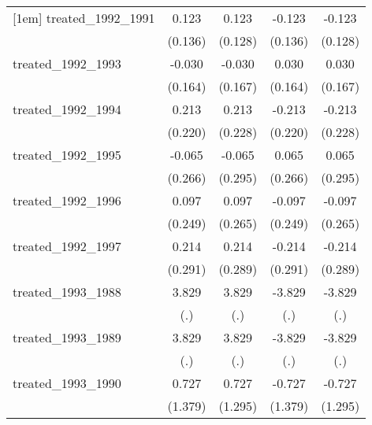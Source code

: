 {\begin{tabular}{l*{4}{c}}
[1em]
treated\_1992\_1991&       0.123         &       0.123         &      -0.123         &      -0.123         \\
            &     (0.136)         &     (0.128)         &     (0.136)         &     (0.128)         \\
[1em]
treated\_1992\_1993&      -0.030         &      -0.030         &       0.030         &       0.030         \\
            &     (0.164)         &     (0.167)         &     (0.164)         &     (0.167)         \\
[1em]
treated\_1992\_1994&       0.213         &       0.213         &      -0.213         &      -0.213         \\
            &     (0.220)         &     (0.228)         &     (0.220)         &     (0.228)         \\
[1em]
treated\_1992\_1995&      -0.065         &      -0.065         &       0.065         &       0.065         \\
            &     (0.266)         &     (0.295)         &     (0.266)         &     (0.295)         \\
[1em]
treated\_1992\_1996&       0.097         &       0.097         &      -0.097         &      -0.097         \\
            &     (0.249)         &     (0.265)         &     (0.249)         &     (0.265)         \\
[1em]
treated\_1992\_1997&       0.214         &       0.214         &      -0.214         &      -0.214         \\
            &     (0.291)         &     (0.289)         &     (0.291)         &     (0.289)         \\
[1em]
treated\_1993\_1988&       3.829         &       3.829         &      -3.829         &      -3.829         \\
            &         (.)         &         (.)         &         (.)         &         (.)         \\
[1em]
treated\_1993\_1989&       3.829         &       3.829         &      -3.829         &      -3.829         \\
            &         (.)         &         (.)         &         (.)         &         (.)         \\
[1em]
treated\_1993\_1990&       0.727         &       0.727         &      -0.727         &      -0.727         \\
            &     (1.379)         &     (1.295)         &     (1.379)         &     (1.295)         \\

\end{tabular}}
